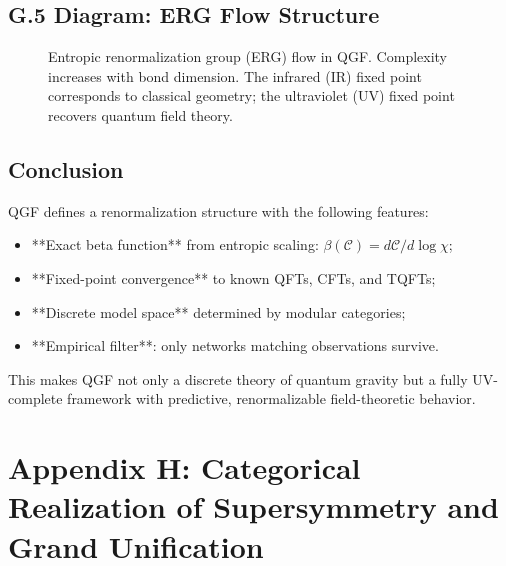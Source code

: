 \documentclass[11pt]{article}
\begin{document}
\subsection*{G.5 Diagram: ERG Flow Structure}

\begin{figure}[H]
\centering
{}
\caption{Entropic renormalization group (ERG) flow in QGF. Complexity increases with bond dimension. The infrared (IR) fixed point corresponds to classical geometry; the ultraviolet (UV) fixed point recovers quantum field theory.}
\label{fig:qgf-erg}
\end{figure}

\subsection*{Conclusion}

QGF defines a renormalization structure with the following features:
\begin{itemize}
  \item **Exact beta function** from entropic scaling: \( \beta(\mathcal{C}) = d\mathcal{C}/d \log \chi \);
  \item **Fixed-point convergence** to known QFTs, CFTs, and TQFTs;
  \item **Discrete model space** determined by modular categories;
  \item **Empirical filter**: only networks matching observations survive.
\end{itemize}

This makes QGF not only a discrete theory of quantum gravity but a fully UV-complete framework with predictive, renormalizable field-theoretic behavior.



\section*{Appendix H: Categorical Realization of Supersymmetry and Grand Unification}
\end{document}

